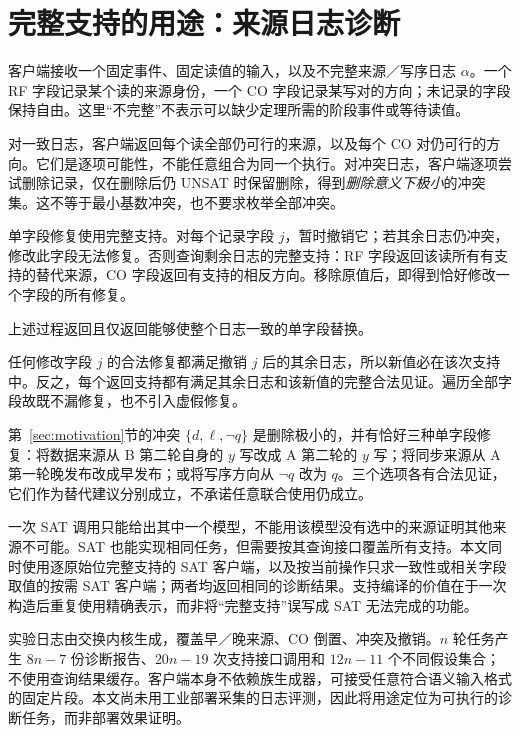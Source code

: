 \section{完整支持的用途：来源日志诊断}\label{sec:task}
客户端接收一个固定事件、固定读值的输入，以及不完整来源／写序日志 $\alpha$。一个 RF 字段记录某个读的来源身份，一个 CO 字段记录某写对的方向；未记录的字段保持自由。这里“不完整”不表示可以缺少定理所需的阶段事件或等待读值。

对一致日志，客户端返回每个读全部仍可行的来源，以及每个 CO 对仍可行的方向。它们是逐项可能性，不能任意组合为同一个执行。对冲突日志，客户端逐项尝试删除记录，仅在删除后仍 UNSAT 时保留删除，得到\emph{删除意义下极小}的冲突集。这不等于最小基数冲突，也不要求枚举全部冲突。

单字段修复使用完整支持。对每个记录字段 $j$，暂时撤销它；若其余日志仍冲突，修改此字段无法修复。否则查询剩余日志的完整支持：RF 字段返回该读所有有支持的替代来源，CO 字段返回有支持的相反方向。移除原值后，即得到恰好修改一个字段的所有修复。

\begin{cprop}[单字段修复的完备性]\label{prop:repair}
上述过程返回且仅返回能够使整个日志一致的单字段替换。
\end{cprop}
\begin{cproof}
任何修改字段 $j$ 的合法修复都满足撤销 $j$ 后的其余日志，所以新值必在该次支持中。反之，每个返回支持都有满足其余日志和该新值的完整合法见证。遍历全部字段故既不漏修复，也不引入虚假修复。
\end{cproof}

第~\ref{sec:motivation}节的冲突 $\{d,\ell,\neg q\}$ 是删除极小的，并有恰好三种单字段修复：将数据来源从 B 第二轮自身的 $y$ 写改成 A 第二轮的 $y$ 写；将同步来源从 A 第一轮晚发布改成早发布；或将写序方向从 $\neg q$ 改为 $q$。三个选项各有合法见证，它们作为替代建议分别成立，不承诺任意联合使用仍成立。

一次 SAT 调用只能给出其中一个模型，不能用该模型没有选中的来源证明其他来源不可能。SAT 也能实现相同任务，但需要按其查询接口覆盖所有支持。本文同时使用逐原始位完整支持的 SAT 客户端，以及按当前操作只求一致性或相关字段取值的按需 SAT 客户端；两者均返回相同的诊断结果。支持编译的价值在于一次构造后重复使用精确表示，而非将“完整支持”误写成 SAT 无法完成的功能。

实验日志由交换内核生成，覆盖早／晚来源、CO 倒置、冲突及撤销。$n$ 轮任务产生 $8n-7$ 份诊断报告、$20n-19$ 次支持接口调用和 $12n-11$ 个不同假设集合；不使用查询结果缓存。客户端本身不依赖族生成器，可接受任意符合语义输入格式的固定片段。本文尚未用工业部署采集的日志评测，因此将用途定位为可执行的诊断任务，而非部署效果证明。
